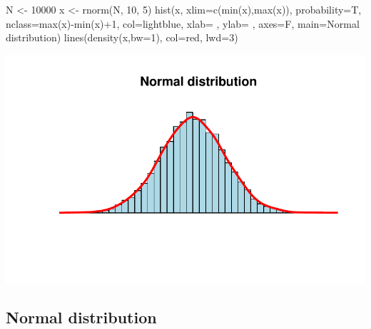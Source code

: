 \documentclass[
  letterpaper,
  DIV=11,
  numbers=noendperiod]{scrartcl}
\newenvironment{Shaded}{\begin{snugshade}}{\end{snugshade}}
\newcommand{\AttributeTok}[1]{\textcolor[rgb]{0.40,0.45,0.13}{#1}}
\newcommand{\DecValTok}[1]{\textcolor[rgb]{0.68,0.00,0.00}{#1}}
\newcommand{\FunctionTok}[1]{\textcolor[rgb]{0.28,0.35,0.67}{#1}}
\newcommand{\NormalTok}[1]{\textcolor[rgb]{0.00,0.23,0.31}{#1}}
\newcommand{\OtherTok}[1]{\textcolor[rgb]{0.00,0.23,0.31}{#1}}
\newcommand{\SpecialCharTok}[1]{\textcolor[rgb]{0.37,0.37,0.37}{#1}}
\newcommand{\StringTok}[1]{\textcolor[rgb]{0.13,0.47,0.30}{#1}}
\begin{document}
\begin{Shaded}
\begin{Highlighting}[]
\NormalTok{ N }\OtherTok{\textless{}{-}} \DecValTok{10000}
\NormalTok{ x }\OtherTok{\textless{}{-}} \FunctionTok{rnorm}\NormalTok{(N, }\DecValTok{10}\NormalTok{, }\DecValTok{5}\NormalTok{)}
 \FunctionTok{hist}\NormalTok{(x, }
 \AttributeTok{xlim=}\FunctionTok{c}\NormalTok{(}\FunctionTok{min}\NormalTok{(x),}\FunctionTok{max}\NormalTok{(x)), }\AttributeTok{probability=}\NormalTok{T, }\AttributeTok{nclass=}\FunctionTok{max}\NormalTok{(x)}\SpecialCharTok{{-}}\FunctionTok{min}\NormalTok{(x)}\SpecialCharTok{+}\DecValTok{1}\NormalTok{, }
   \AttributeTok{col=}\StringTok{\textquotesingle{}lightblue\textquotesingle{}}\NormalTok{, }\AttributeTok{xlab=}\StringTok{\textquotesingle{} \textquotesingle{}}\NormalTok{, }\AttributeTok{ylab=}\StringTok{\textquotesingle{} \textquotesingle{}}\NormalTok{, }\AttributeTok{axes=}\NormalTok{F,}
   \AttributeTok{main=}\StringTok{\textquotesingle{}Normal distribution\textquotesingle{}}\NormalTok{)}
\FunctionTok{lines}\NormalTok{(}\FunctionTok{density}\NormalTok{(x,}\AttributeTok{bw=}\DecValTok{1}\NormalTok{), }\AttributeTok{col=}\StringTok{\textquotesingle{}red\textquotesingle{}}\NormalTok{, }\AttributeTok{lwd=}\DecValTok{3}\NormalTok{)}
\end{Highlighting}
\end{Shaded}

\includegraphics{index_files/figure-pdf/unnamed-chunk-16-1.pdf}

\subsection{Normal distribution}\label{normal-distribution-1}
\end{document}
